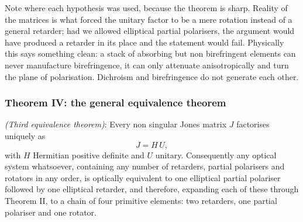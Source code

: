             Note where each hypothesis was used, because the theorem is sharp. Reality of the matrices is what forced the unitary factor to be a mere rotation instead of a general retarder; had we allowed elliptical partial polarisers, the argument would have produced a retarder in its place and the statement would fail. Physically this says something clean: a stack of absorbing but non birefringent elements can never manufacture birefringence, it can only attenuate anisotropically and turn the plane of polarisation. Dichroism and birefringence do not generate each other.

        \subsubsection{Theorem IV: the general equivalence theorem}

            \begin{myteo}
                \textit{(Third equivalence theorem)}: Every non singular Jones matrix $J$ factorises uniquely as
                \begin{equation}\label{eq:PolarDecomposition}
                    J = H\,U ,
                \end{equation}
                with $H$ Hermitian positive definite and $U$ unitary. Consequently any optical system whatsoever, containing any number of retarders, partial polarisers and rotators in any order, is optically equivalent to one elliptical partial polariser followed by one elliptical retarder, and therefore, expanding each of these through Theorem II, to a chain of four primitive elements: two retarders, one partial polariser and one rotator.
            \end{myteo}

